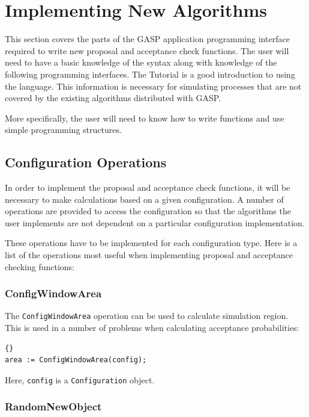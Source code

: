 \section{Implementing New Algorithms}\label{sect:new-algorithms}

This section covers the parts of the GASP application programming
interface required to write new proposal and acceptance check
functions.  The user will need to have a basic knowledge of the \GAP{}
syntax along with knowledge of the following programming interfaces.
The \GAP{} Tutorial \cite{gap-tut} is a good introduction to using the
\GAP{} language.  This information is necessary for simulating
processes that are not covered by the existing algorithms distributed
with GASP.

More specifically, the user will need to know how to write functions
and use simple programming structures.

\subsection{Configuration Operations}

In order to implement the proposal and acceptance check functions, it
will be necessary to make calculations based on a given configuration.
A number of operations are provided to access the configuration so
that the algorithms the user implements are not dependent on a
particular configuration implementation.

These operations have to be implemented for each configuration type.
Here is a list of the operations most useful when implementing
proposal and acceptance checking functions:

\subsubsection{ConfigWindowArea}

The \texttt{ConfigWindowArea} operation can be used to calculate
simulation region.  This is used in a number of problems when
calculating acceptance probabilities:
\begin{lstlisting}{}
area := ConfigWindowArea(config);
\end{lstlisting}

\noindent Here, \texttt{config} is a \texttt{Configuration} object.

\subsubsection{RandomNewObject}

